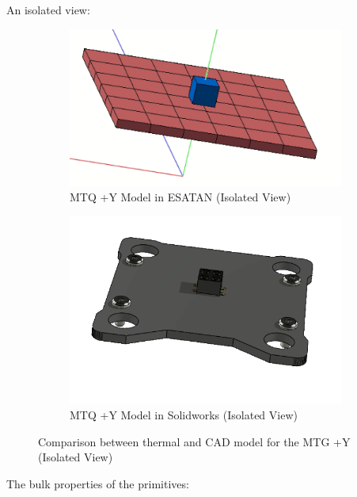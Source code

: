 An isolated view:

\begin{figure}[H]
    \centering
    \begin{subfigure}{.5\textwidth}
      \centering
      \includegraphics[width=.6\linewidth]{res/img/5_simulationanalisys/Comparisons/ESATAN/MTQ_Raw.PNG}
      \caption{MTQ +Y Model in ESATAN (Isolated View)}
      \label{fig:magraw}
    \end{subfigure}%
    \begin{subfigure}{.5\textwidth}
      \centering
      \includegraphics[width=.5\linewidth]{res/img/5_simulationanalisys/Comparisons/SLDW/MTQ_Raw_Solid.PNG}
      \caption{MTQ +Y Model in Solidworks (Isolated View)}
      \label{fig:magrawsolid}
    \end{subfigure}
    \caption{Comparison between thermal and CAD model for the MTG +Y (Isolated View)}
    \label{fig:magrawim}
\end{figure}

The bulk properties of the primitives:

